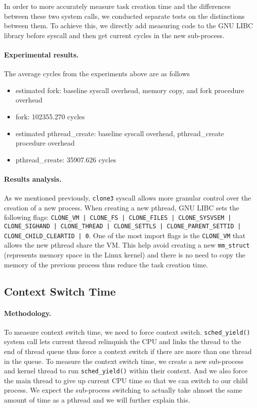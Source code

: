 In order to more accurately measure task creation time and the differences between these two system calls, we conducted separate tests on the distinctions between them. To achieve this, we directly add measuring code to the GNU LIBC library before syscall and then get current cycles in the new sub-process. 

\paragraph{Experimental results.}
The average cycles from the experiments above are as follows
\begin{itemize}[leftmargin=*]
    \item estimated fork: baseline syscall overhead, memory copy, and fork procedure overhead
	\item fork: 102355.270 cycles
    \item estimated pthread\_create: baseline syscall overhead, pthread\_create procedure overhead
	\item pthread\_create: 35907.626 cycles
\end{itemize}

\paragraph{Results analysis.} As we mentioned previously, \texttt{clone3} syscall allows more granular control over the creation of a new process. When creating a new pthread, GNU LIBC sets the following flags: \texttt{CLONE\_VM | CLONE\_FS | CLONE\_FILES | CLONE\_SYSVSEM | CLONE\_SIGHAND | CLONE\_THREAD | CLONE\_SETTLS | CLONE\_PARENT\_SETTID | CLONE\_CHILD\_CLEARTID | 0}. One of the most import flags is the \texttt{CLONE\_VM} that allows the new pthread share the VM. This help avoid creating a new \texttt{mm\_struct} (represents memory space in the Linux kernel) and there is no need to copy the memory of the previous process thus reduce the task creation time.

\subsection{Context Switch Time}
\paragraph{Methodology.} To measure context switch time, we need to force context switch. \texttt{sched\_yield()} system call lets current thread relinquish the CPU and links the thread to the end of thread queue thus force a context switch if there are more than one thread in the queue. To measure the context switch time, we create a new sub-process and kernel thread to run \texttt{sched\_yield()} within their context. And we also force the main thread to give up current CPU time so that we can switch to our child process. We expect the sub-process switching to actually take almost the same amount of time as a pthread and we will further explain this.

